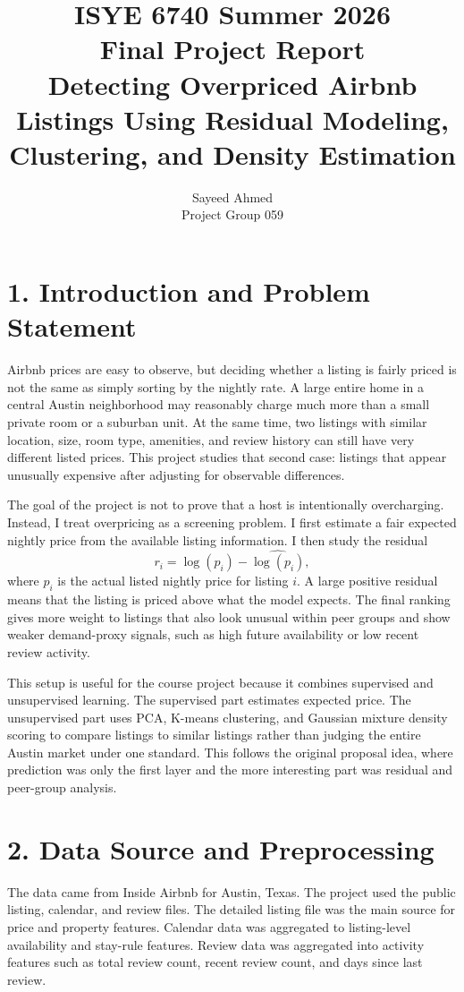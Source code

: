 \documentclass[11pt]{article}
\title{ISYE 6740 Summer 2026\\Final Project Report\\Detecting Overpriced Airbnb Listings Using Residual Modeling, Clustering, and Density Estimation}
\author{Sayeed Ahmed\\Project Group 059}
\date{}
\begin{document}
\maketitle

\section*{1. Introduction and Problem Statement}

Airbnb prices are easy to observe, but deciding whether a listing is fairly priced is not the same as simply sorting by the nightly rate. A large entire home in a central Austin neighborhood may reasonably charge much more than a small private room or a suburban unit. At the same time, two listings with similar location, size, room type, amenities, and review history can still have very different listed prices. This project studies that second case: listings that appear unusually expensive after adjusting for observable differences.

The goal of the project is not to prove that a host is intentionally overcharging. Instead, I treat overpricing as a screening problem. I first estimate a fair expected nightly price from the available listing information. I then study the residual
\[
 r_i = \log(p_i)-\widehat{\log(p_i)},
\]
where $p_i$ is the actual listed nightly price for listing $i$. A large positive residual means that the listing is priced above what the model expects. The final ranking gives more weight to listings that also look unusual within peer groups and show weaker demand-proxy signals, such as high future availability or low recent review activity.

This setup is useful for the course project because it combines supervised and unsupervised learning. The supervised part estimates expected price. The unsupervised part uses PCA, K-means clustering, and Gaussian mixture density scoring to compare listings to similar listings rather than judging the entire Austin market under one standard. This follows the original proposal idea, where prediction was only the first layer and the more interesting part was residual and peer-group analysis.

\section*{2. Data Source and Preprocessing}

The data came from Inside Airbnb for Austin, Texas. The project used the public listing, calendar, and review files. The detailed listing file was the main source for price and property features. Calendar data was aggregated to listing-level availability and stay-rule features. Review data was aggregated into activity features such as total review count, recent review count, and days since last review.
\end{document}
